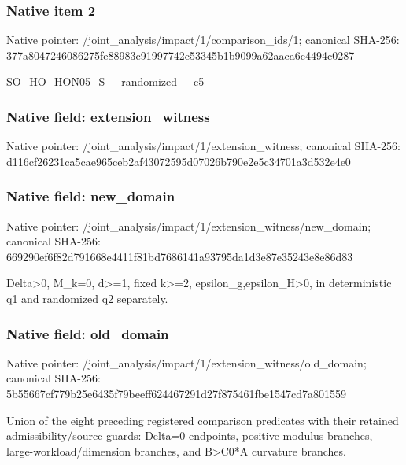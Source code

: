 \documentclass[10pt,a4paper]{article}
\begin{document}
\subsubsection{Native item 2}
Native pointer: /joint\_\allowbreak{}analysis/impact/1/comparison\_\allowbreak{}ids/1; canonical SHA-256: 377a8047246086275fe88983c91997742c53345b1b9099a62aaca6c4494c0287

\begingroup\raggedright\sloppy SO\_\allowbreak{}HO\_\allowbreak{}HON05\_\allowbreak{}S\_\allowbreak{}\_\allowbreak{}randomized\_\allowbreak{}\_\allowbreak{}c5\par\endgroup

\subsubsection{Native field: extension\_\allowbreak{}witness}
Native pointer: /joint\_\allowbreak{}analysis/impact/1/extension\_\allowbreak{}witness; canonical SHA-256: d116cf26231ca5cae965ceb2af43072595d07026b790e2e5c34701a3d532e4e0

\subsubsection{Native field: new\_\allowbreak{}domain}
Native pointer: /joint\_\allowbreak{}analysis/impact/1/extension\_\allowbreak{}witness/new\_\allowbreak{}domain; canonical SHA-256: 669290ef6f82d791668e4411f81bd7686141a93795da1d3e87e35243e8e86d83

\begingroup\raggedright\sloppy Delta>0,\allowbreak{} M\_\allowbreak{}k=\allowbreak{}0,\allowbreak{} d>=\allowbreak{}1,\allowbreak{} fixed k>=\allowbreak{}2,\allowbreak{} epsilon\_\allowbreak{}g,\allowbreak{}epsilon\_\allowbreak{}H>0,\allowbreak{} in deterministic q1 and randomized q2 separately.\par\endgroup

\subsubsection{Native field: old\_\allowbreak{}domain}
Native pointer: /joint\_\allowbreak{}analysis/impact/1/extension\_\allowbreak{}witness/old\_\allowbreak{}domain; canonical SHA-256: 5b55667cf779b25e6435f79beeff624467291d27f875461fbe1547cd7a801559

\begingroup\raggedright\sloppy Union of the eight preceding registered comparison predicates with their retained admissibility/\allowbreak{}source guards:\allowbreak{} Delta=\allowbreak{}0 endpoints,\allowbreak{} positive-modulus branches,\allowbreak{} large-workload/\allowbreak{}dimension branches,\allowbreak{} and B>C0*A curvature branches.\par\endgroup
\end{document}
